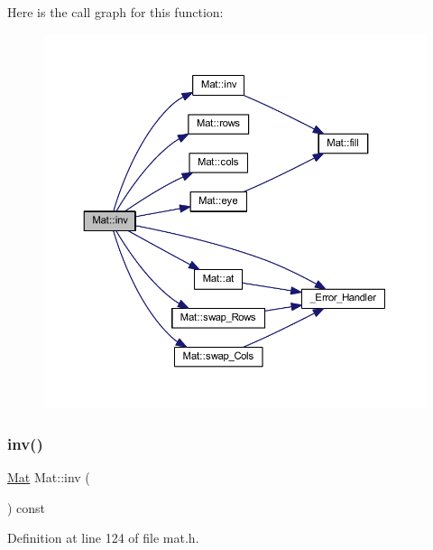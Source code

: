 Here is the call graph for this function\+:
\nopagebreak
\begin{figure}[H]
\begin{center}
\leavevmode
\includegraphics[width=350pt]{class_mat_a22ba19e51a04cbf9211b070b696ae399_cgraph}
\end{center}
\end{figure}
\mbox{\label{class_mat_a8655dfdd2bcf36aeb250f71b746632c3}} 
\subsubsection{\texorpdfstring{inv()}{inv()}\hspace{0.1cm}{\footnotesize\ttfamily [2/2]}}
{\footnotesize\ttfamily \mbox{\hyperlink{class_mat}{Mat}} Mat\+::inv (\begin{DoxyParamCaption}{ }\end{DoxyParamCaption}) const\hspace{0.3cm}{\ttfamily [inline]}}



Definition at line 124 of file mat.\+h.

